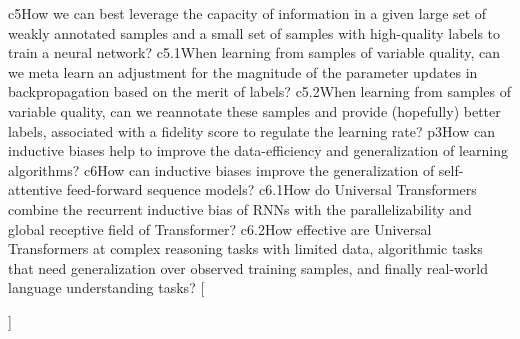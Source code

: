 {{    {c5}{How we can best leverage the capacity of information in a given large set of weakly annotated samples and a small set of samples with high-quality labels to train a neural network?}%
    {c5.1}{When learning from samples of variable quality, can we meta learn an adjustment for the magnitude of the parameter updates in backpropagation based on the merit of labels?}
    {c5.2}{When learning from samples of variable quality, can we reannotate these samples and provide (hopefully) better labels, associated with a fidelity score to regulate the learning rate?}
    {p3}{How can inductive biases help to improve the data-efficiency and generalization of learning algorithms?}
    {c6}{How can inductive biases improve the generalization of self-attentive feed-forward sequence models?}
    {c6.1}{How do Universal Transformers combine the recurrent inductive bias of RNNs with the parallelizability and global receptive field of Transformer?}
    {c6.2}{How effective are Universal Transformers at complex reasoning tasks with limited data, algorithmic tasks that need generalization over observed training samples, and finally real-world language understanding tasks?}
    }[\PackageError{rq}{Undefined option to rq: #1}{}]%
}%

\newcommand{\resqname}[1]{%
    \IfEqCase{#1}{%
    {main}{RQ-Main}
    {p1}{RQ-1}
    {c2}{RQ-1.1}
    {c2.1}{RQ-1.1.1}
    {c2.2}{RQ-1.1.2}
    {c2.3}{RQ-1.1.3}
    {c3}{RQ-1.2}
    {c3.1}{RQ-1.2.1}
    {c3.2}{RQ-1.2.2}
    {c3.3}{RQ-1.2.3}
    {p2}{RQ-2}
    {c4}{RQ-2.1}%
    {c4.1}{RQ-2.1.1}
    {c4.2}{RQ-2.1.2}
    {c4.3}{RQ-2.1.3}
    {c5}{RQ-2.2}%
    {c5.1}{RQ-2.2.1}
    {c5.2}{RQ-2.2.2}
    {p3}{RQ-3}
    {c6}{RQ-3.1}%
    {c6.1}{RQ-3.1.1}
    {c6.2}{RQ-3.1.2}
    }[\PackageError{rq}{Undefined option to rq: #1}{}]%
}%

\newcommand{\resq}[1]{%
    \begin{resqbox}
        \begin{enumerate}
            \item[\textbf{\resqname{#1}}] \emph{\resqcontent{#1}}
        \end{enumerate}
    \end{resqbox}
}%